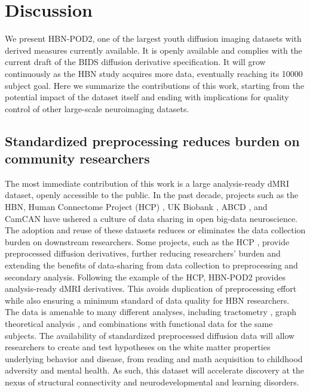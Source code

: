 \documentclass[fleqn,10pt]{wlscirep}
\begin{document}
\section*{Discussion}

We present HBN-POD2, one of the largest youth diffusion imaging datasets with
derived measures currently available. It is openly available and complies with
the current draft of the BIDS diffusion derivative specification. It will grow
continuously as the HBN study acquires more data, eventually reaching its
\num{10000} subject goal. Here we summarize the contributions of this work,
starting from the potential impact of the dataset itself and ending with implications for
quality control of other large-scale neuroimaging datasets.

\subsection*{Standardized preprocessing reduces burden on community researchers}

The most immediate contribution of this work is a large analysis-ready dMRI
dataset, openly accessible to the public. In the past decade, projects such as
the HBN, Human Connectome Project (HCP) \cite{van_essen2013-oi}, UK Biobank
\cite{miller2016-mq}, ABCD \cite{jernigan2018-my}, and CamCAN
\cite{taylor2017-or,shafto2014-ld} have ushered a culture of data sharing in
open big-data neuroscience. The adoption and reuse of these datasets reduces or
eliminates the data collection burden on downstream researchers.  Some projects,
such as the HCP \cite{glasser2013-lo}, provide preprocessed diffusion
derivatives, further reducing researchers' burden and extending the benefits of
data-sharing from data collection to preprocessing and secondary analysis.
Following the example of the HCP, HBN-POD2 provides analysis-ready dMRI
derivatives. This avoids duplication of preprocessing effort while also ensuring
a minimum standard of data quality for HBN researchers. The data is amenable to
many different analyses, including tractometry \cite{yeatman2012-rc}, graph
theoretical analysis \cite{yeh2020-nu}, and combinations with functional data
for the same subjects.  The availability of standardized preprocessed diffusion
data will allow researchers to create and test hypotheses on the white matter
properties underlying behavior and disease, from reading and math acquisition to
childhood adversity and mental health. As such, this dataset will accelerate
discovery at the nexus of structural connectivity and neurodevelopmental and
learning disorders.
\end{document}
